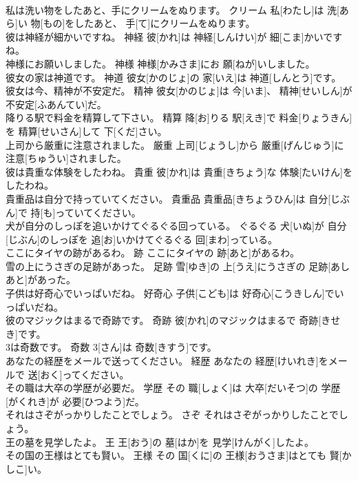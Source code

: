\documentclass[8pt]{extreport}
\begin{document}
\begin{CJK}{UTF8}{min}
\\	私は洗い物をしたあと、手にクリームをぬります。	クリーム	私[わたし]は 洗[あら]い 物[もの]をしたあと、 手[て]にクリームをぬります。	
\\	彼は神経が細かいですね。	神経	彼[かれ]は 神経[しんけい]が 細[こま]かいですね。	
\\	神様にお願いしました。	神様	神様[かみさま]にお 願[ねが]いしました。	
\\	彼女の家は神道です。	神道	彼女[かのじょ]の 家[いえ]は 神道[しんとう]です。	
\\	彼女は今、精神が不安定だ。	精神	彼女[かのじょ]は 今[いま]、 精神[せいしん]が 不安定[ふあんてい]だ。	
\\	降りる駅で料金を精算して下さい。	精算	降[お]りる 駅[えき]で 料金[りょうきん]を 精算[せいさん]して 下[くだ]さい。	
\\	上司から厳重に注意されました。	厳重	上司[じょうし]から 厳重[げんじゅう]に 注意[ちゅうい]されました。	
\\	彼は貴重な体験をしたわね。	貴重	彼[かれ]は 貴重[きちょう]な 体験[たいけん]をしたわね。	
\\	貴重品は自分で持っていてください。	貴重品	貴重品[きちょうひん]は 自分[じぶん]で 持[も]っていてください。	
\\	犬が自分のしっぽを追いかけてぐるぐる回っている。	ぐるぐる	犬[いぬ]が 自分[じぶん]のしっぽを 追[お]いかけてぐるぐる 回[まわ]っている。	
\\	ここにタイヤの跡があるわ。	跡	ここにタイヤの 跡[あと]があるわ。	
\\	雪の上にうさぎの足跡があった。	足跡	雪[ゆき]の 上[うえ]にうさぎの 足跡[あしあと]があった。	
\\	子供は好奇心でいっぱいだね。	好奇心	子供[こども]は 好奇心[こうきしん]でいっぱいだね。	
\\	彼のマジックはまるで奇跡です。	奇跡	彼[かれ]のマジックはまるで 奇跡[きせき]です。	
\\	3は奇数です。	奇数	3[さん]は 奇数[きすう]です。	
\\	あなたの経歴をメールで送ってください。	経歴	あなたの 経歴[けいれき]をメールで 送[おく]ってください。	
\\	その職は大卒の学歴が必要だ。	学歴	その 職[しょく]は 大卒[だいそつ]の 学歴[がくれき]が 必要[ひつよう]だ。	
\\	それはさぞがっかりしたことでしょう。	さぞ	それはさぞがっかりしたことでしょう。	
\\	王の墓を見学したよ。	王	王[おう]の 墓[はか]を 見学[けんがく]したよ。	
\\	その国の王様はとても賢い。	王様	その 国[くに]の 王様[おうさま]はとても 賢[かしこ]い。	

\end{CJK}
\end{document}
